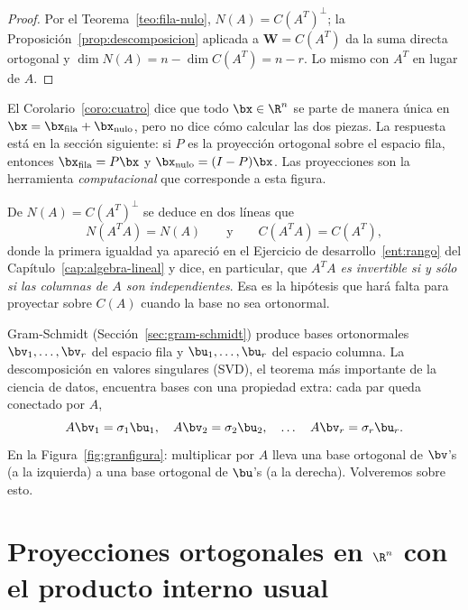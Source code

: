 \begin{proof}
Por el Teorema~\ref{teo:fila-nulo}, $N(A)=C(A^T)^{\perp}$; la
Proposición~\ref{prop:descomposicion} aplicada a $\mathbf{W}=C(A^T)$ da la
suma directa ortogonal y $\dim N(A)=n-\dim C(A^T)=n-r$. Lo mismo con $A^T$
en lugar de $A$.
\end{proof}

\begin{observacion}
El Corolario~\ref{coro:cuatro} dice que todo $\bx\in\R^n$ se parte de manera
única en $\bx=\bx_{\text{fila}}+\bx_{\text{nulo}}$, pero no dice cómo
calcular las dos piezas. La respuesta está en la sección siguiente: si $P$ es
la proyección ortogonal sobre el espacio fila, entonces
$\bx_{\text{fila}}=P\bx$ y $\bx_{\text{nulo}}=(I-P)\bx$. Las proyecciones
son la herramienta \emph{computacional} que corresponde a esta figura.
\end{observacion}

\begin{observacion}
\label{obs:ATA}
De $N(A)=C(A^T)^{\perp}$ se deduce en dos líneas que
\[
N(A^TA)=N(A)
\qquad\text{y}\qquad
C(A^TA)=C(A^T),
\]
donde la primera igualdad ya apareció en el
Ejercicio de desarrollo~\ref{ent:rango} del Capítulo~\ref{cap:algebra-lineal}
y dice, en particular, que \emph{$A^TA$ es invertible si y sólo si las
columnas de $A$ son independientes}. Esa es la hipótesis que hará falta para
proyectar sobre $C(A)$ cuando la base no sea ortonormal.
\end{observacion}

\begin{observacion}
Gram-Schmidt (Sección~\ref{sec:gram-schmidt}) produce bases ortonormales
$\bv_1,\dots,\bv_r$ del espacio fila y $\bu_1,\dots,\bu_r$ del espacio
columna. La descomposición en valores singulares (SVD), el teorema más
importante de la ciencia de datos, encuentra bases con una propiedad extra:
cada par queda conectado por $A$,
\[
A\bv_1=\sigma_1\bu_1,\quad A\bv_2=\sigma_2\bu_2,\quad\dots\quad
A\bv_r=\sigma_r\bu_r .
\]
En la Figura~\ref{fig:granfigura}: multiplicar por $A$ lleva una base
ortogonal de $\bv$'s (a la izquierda) a una base ortogonal de $\bu$'s (a la
derecha). Volveremos sobre esto.
\end{observacion}

\section{Proyecciones ortogonales en $\R^n$ con el producto interno usual}\label{sec:proyecciones}

